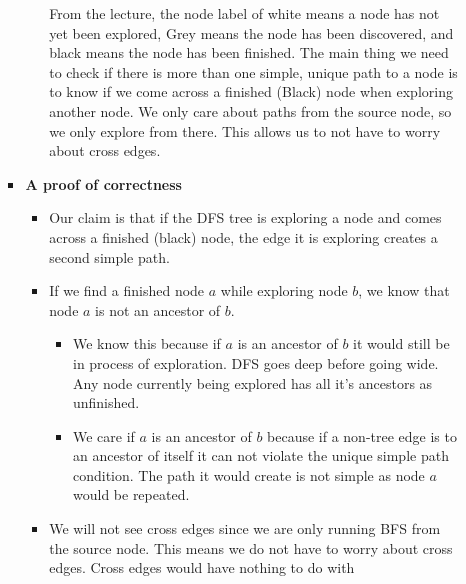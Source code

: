 \documentclass[letterpaper,11pt]{article}
\begin{document}
\begin{enumerate}
\begin{enumerate}
\begin{itemize}
\begin{itemize}
\begin{algorithm}[H]
        \end{algorithm}

        \color{teal}
        From the lecture, the node label of white means a node has not yet been 
        explored, Grey means the node has been discovered, and black means the
        node has been finished. The main thing we need to check if there is more
        than one simple, unique path to a node is to know if we come across a
        finished (Black) node when exploring another node. We only care about
        paths from the source node, so we only explore from there. This 
        allows us to not have to worry about cross edges. 

        \end{itemize}

    \color{teal}
    \item \textbf{A proof of correctness}
            \begin{itemize}
                \item Our claim is that if the DFS tree is exploring a node and comes 
                    across a finished (black) node, the edge it is exploring creates 
                    a second simple path.
                \item If we find a finished node $a$ while exploring node $b$, 
                    we know that node $a$ is not an ancestor of $b$.  
                    \begin{itemize}
                        \item We know this because if $a$ is an 
                            ancestor of $b$ it would still be in process of 
                            exploration. DFS goes deep before going wide. Any
                            node currently being explored has all it's ancestors
                            as unfinished. 
                        \item We care if $a$ is an ancestor of $b$ because if a
                            non-tree edge is to an ancestor of itself it can
                            not violate the unique simple path condition. The 
                            path it would create is not simple as node $a$ would
                            be repeated.
                    \end{itemize}
                \item We will not see cross edges since we are only running BFS 
                    from the source node. This means we do not have to worry 
                    about cross edges. Cross edges would have nothing to do with

\end{itemize}
\end{itemize}
\end{enumerate}
\end{enumerate}
\end{document}
